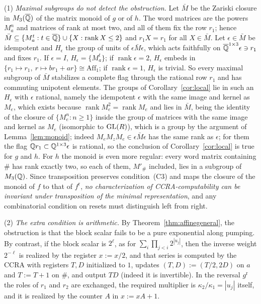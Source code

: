 \begin{remark}\label{rem:localcond}
(1) \emph{Maximal subgroups do not detect the obstruction.} Let $\bar M$ be the Zariski closure in $M_3(\overline{\mathbb{Q}})$ of the matrix monoid of $g$ or of $h$. The word matrices are the powers $M_a^n$ and matrices of rank at most two, and all of them fix the row $r_1$; hence $\bar M\subseteq\{M_a^t:t\in\overline{\mathbb{Q}}\}\cup\{X:\operatorname{rank}X\le2\}$ and $r_1X=r_1$ for all $X\in\bar M$. Let $\epsilon\in\bar M$ be idempotent and $H_\epsilon$ the group of units of $\epsilon\bar M\epsilon$, which acts faithfully on $\overline{\mathbb{Q}}^{1\times3}\epsilon\ni r_1$ and fixes $r_1$. If $\epsilon=I$, $H_\epsilon=\{M_a^t\}$; if $\operatorname{rank}\epsilon=2$, $H_\epsilon$ embeds in $\{r_1\mapsto r_1,\ r\mapsto br_1+ar\}\cong\mathrm{Aff}_1$; if $\operatorname{rank}\epsilon=1$, $H_\epsilon$ is trivial. So every maximal subgroup of $\bar M$ stabilizes a complete flag through the rational row $r_1$ and has commuting unipotent elements. The groups of Corollary~\ref{cor:local} lie in such an $H_\epsilon$ with $\epsilon$ rational, namely the idempotent $\epsilon$ with the same image and kernel as $M_e$, which exists because $\operatorname{rank}M_e^2=\operatorname{rank}M_e$ and lies in $\bar M$, being the identity of the closure of $\{M_e^n:n\ge1\}$ inside the group of matrices with the same image and kernel as $M_e$ (isomorphic to $\mathrm{GL}(R)$), which is a group by the argument of Lemma~\ref{lem:monoid}; indeed $M_eM_zM_e\in\epsilon\bar M\epsilon$ has the same rank as $\epsilon$; for them the flag $\mathbb{Q} r_1\subset\mathbb{Q}^{1\times3}\epsilon$ is rational, so the conclusion of Corollary~\ref{cor:local} is true for $g$ and $h$. For $h$ the monoid is even more regular: every word matrix containing $\#$ has rank exactly two, so each of them, $M'_\#$ included, lies in a subgroup of $M_3(\mathbb{Q})$. Since transposition preserves condition~(C3) and maps the closure of the monoid of $f$ to that of $f^{\mathrm r}$, \emph{no characterization of CCRA-computability can be invariant under transposition of the minimal representation}, and any combinatorial condition on resets must distinguish left from right.

(2) \emph{The extra condition is arithmetic.} By Theorem~\ref{thm:affinegeneral}, the obstruction is that the block scalar fails to be a pure exponential along pumping. By contrast, if the block scalar is $2^\ell$, as for $\sum_i\prod_{j<i}2^{|u_j|}$, then the inverse weight $2^{-\ell}$ is realized by the register $x:=x/2$, and that series is computed by the CCRA with registers $T,D$ initialized to $1$, updates $(T,D):=(T/2,2D)$ on $a$ and $T:=T+1$ on $\#$, and output $TD$ (indeed it is invertible). In the reversal $g^{\mathrm r}$ the roles of $r_1$ and $r_2$ are exchanged, the required multiplier is $\kappa_2/\kappa_1=|u_j|$ itself, and it is realized by the counter $A$ in $x:=xA+1$.
\end{remark}

